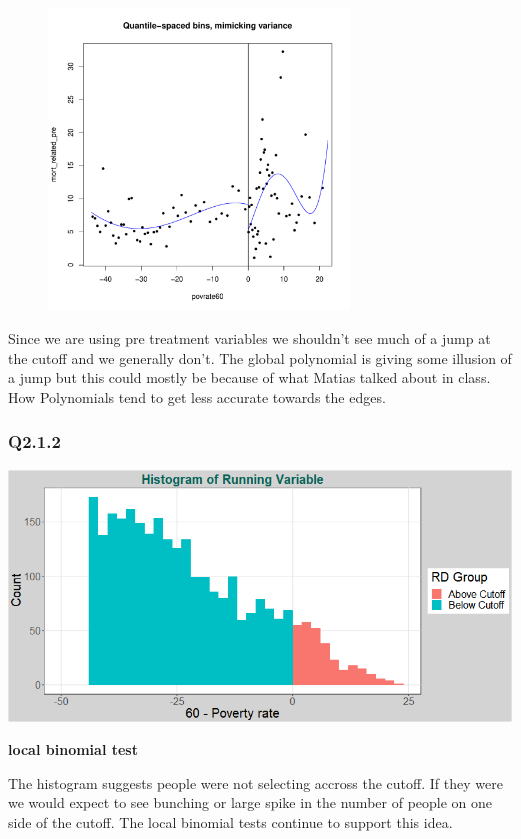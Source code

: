 \documentclass[11pt]{article}
\begin{document}
\begin{figure}[H]
{		\includegraphics[width=80mm]{plot_211iib.pdf}
	}
	
\end{figure}

Since we are using pre treatment variables we shouldn't see much of a jump at the cutoff and we generally don't. The global polynomial is giving some illusion of a jump but this could mostly be because of what Matias talked about in class. How Polynomials tend to get less accurate towards the edges. 
\subsubsection{Q2.1.2}
\begin{center}
	\includegraphics[width=.8\linewidth]{plot_212i.png}
	
\end{center}
\begin{center}
	\centering
	\textbf{local binomial test}\par\medskip
	\scalebox{0.85}{
		
	}
\end{center}
The histogram suggests people were not selecting accross the cutoff. If they were we would expect to see bunching or large spike in the number of people on one side of the cutoff. The local binomial tests continue to support this idea. 
\end{document}
